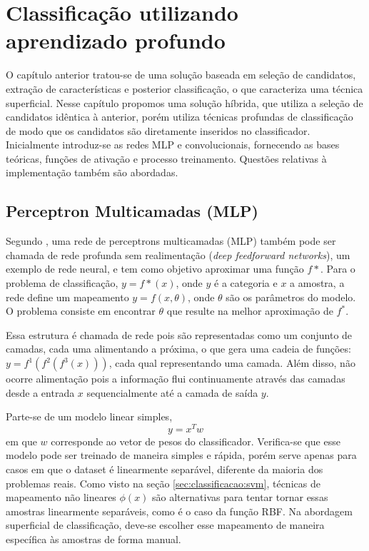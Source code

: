 \chapter{Classificação utilizando aprendizado profundo}

O capítulo anterior tratou-se de uma solução baseada em seleção de candidatos, extração de características e posterior classificação, o que caracteriza uma técnica superficial. Nesse capítulo propomos uma solução híbrida, que utiliza a seleção de candidatos idêntica à anterior, porém utiliza técnicas profundas de classificação de modo que os candidatos são diretamente inseridos no classificador. Inicialmente introduz-se as redes MLP e convolucionais, fornecendo as bases teóricas, funções de ativação e processo treinamento.  Questões relativas à implementação também são abordadas.

\section{Perceptron Multicamadas (MLP)}

Segundo \cite{DLbook}, uma rede de perceptrons multicamadas (MLP) também pode ser chamada de rede profunda sem realimentação (\textit{deep feedforward networks}), um exemplo de rede neural, e tem como objetivo aproximar uma função $f*$. Para o problema de classificação, $y=f*(x)$, onde $y$ é a categoria e $x$ a amostra, a rede define um mapeamento $y = f(x,\theta)$, onde $\theta$ são os parâmetros do modelo. O problema consiste em encontrar $\theta$ que resulte na melhor aproximação de $f^*$.

Essa estrutura é chamada de rede pois são representadas como um conjunto de camadas, cada uma alimentando a próxima, o que gera uma cadeia de funções: $y=f^1(f^2(f^3(x)))$, cada qual representando uma camada. Além disso, não ocorre alimentação pois a informação flui continuamente através das camadas desde a entrada $x$ sequencialmente até a camada de saída $y$.

Parte-se de um modelo linear simples,
\begin{equation}
y=x^Tw
\end{equation}
em que $w$ corresponde ao vetor de pesos do classificador. Verifica-se que esse modelo pode ser treinado de maneira simples e rápida, porém serve apenas para casos em que o dataset é linearmente separável, diferente da maioria dos problemas reais. Como visto na seção \ref{sec:classificacao:svm}, técnicas de mapeamento não lineares $\phi(x)$ são alternativas para tentar tornar essas amostras linearmente separáveis, como é o caso da função RBF. Na abordagem superficial de classificação, deve-se escolher esse mapeamento de maneira específica às amostras de forma manual. 

